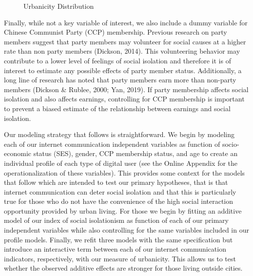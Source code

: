 \documentclass[]{interact}
\theoremstyle{plain}%
\theoremstyle{definition}
\theoremstyle{remark}
\begin{document}
\begin{figure}


\caption{\label{fig-urban-dist}Urbanicity Distribution}

\end{figure}%

Finally, while not a key variable of interest, we also include a dummy
variable for Chinese Communist Party (CCP) membership. Previous research
on party members suggest that party members may volunteer for social
causes at a higher rate than non party members (Dickson, 2014). This
volunteering behavior may contribute to a lower level of feelings of
social isolation and therefore it is of interest to estimate any
possible effects of party member status. Additionally, a long line of
research has noted that party members earn more than non-party members
(Dickson \& Rublee, 2000; Yan, 2019). If party membership affects social
isolation and also affects earnings, controlling for CCP membership is
important to prevent a biased estimate of the relationship between
earnings and social isolation.

Our modeling strategy that follows is straightforward. We begin by
modeling each of our internet communication independent variables as
function of socio-economic status (SES), gender, CCP membership status,
and age to create an individual profile of each type of digital user
(see the Online Appendix for the operationalization of these variables).
This provides some context for the models that follow which are intended
to test our primary hypotheses, that is that internet communication can
deter social isolation and that this is particularly true for those who
do not have the convenience of the high social interaction opportunity
provided by urban living. For those we begin by fitting an additive
model of our index of social isolationism as function of each of our
primary independent variables while also controlling for the same
variables included in our profile models. Finally, we refit three models
with the same specification but introduce an interactive term between
each of our internet communication indicators, respectively, with our
measure of urbanicity. This allows us to test whether the observed
additive effects are stronger for those living outside cities.
\end{document}
